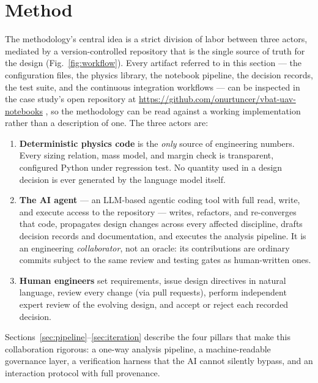 \section{Method}
\label{sec:method}

The methodology's central idea is a strict division of labor between
three actors, mediated by a version-controlled repository that is the
single source of truth for the design
(Fig.~\ref{fig:workflow}). Every artifact referred to in this section
--- the configuration files, the physics library, the notebook
pipeline, the decision records, the test suite, and the continuous
integration workflows --- can be inspected in the case study's open
repository at
\url{https://github.com/onurtuncer/vbat-uav-notebooks}
\citep{tuncer2026vbat}, so the methodology can be read against a
working implementation rather than a description of one. The three
actors are:

\begin{enumerate}[nosep,label=(\roman*)]
\item \textbf{Deterministic physics code} is the \emph{only} source of
  engineering numbers. Every sizing relation, mass model, and margin
  check is transparent, configured Python under regression test. No
  quantity used in a design decision is ever generated by the language
  model itself.
\item \textbf{The AI agent} --- an LLM-based agentic coding tool
  \citep{anthropic2025claudecode} with full read, write, and execute
  access to the repository --- writes, refactors, and re-converges
  that code,
  propagates design changes across every affected discipline, drafts
  decision records and documentation, and executes the analysis
  pipeline. It is an engineering \emph{collaborator}, not an oracle:
  its contributions are ordinary commits subject to the same review
  and testing gates as human-written ones.
\item \textbf{Human engineers} set requirements, issue design
  directives in natural language, review every change (via pull
  requests), perform independent expert review of the evolving design,
  and accept or reject each recorded decision.
\end{enumerate}

Sections~\ref{sec:pipeline}--\ref{sec:iteration} describe the four
pillars that make this collaboration rigorous: a one-way analysis
pipeline, a machine-readable governance layer, a verification harness
that the AI cannot silently bypass, and an interaction protocol with
full provenance.

